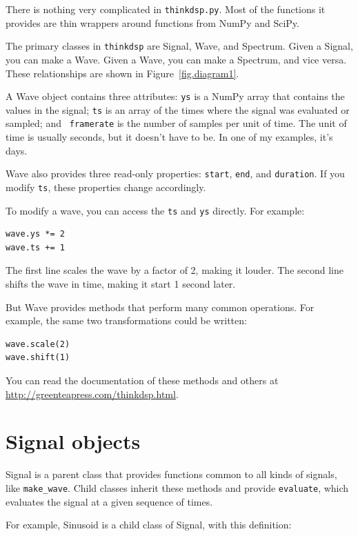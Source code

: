 \documentclass[12pt]{book}
\begin{document}
There is nothing very complicated in {\tt thinkdsp.py}.  Most
of the functions it provides are thin wrappers around functions
from NumPy and SciPy.

The primary classes in {\tt thinkdsp} are Signal, Wave, and Spectrum.
Given a Signal, you can make a Wave.  Given a Wave, you can
make a Spectrum, and vice versa.  These relationships are shown
in Figure~\ref{fig.diagram1}.

A Wave object contains three attributes: {\tt ys} is a NumPy array
that contains the values in the signal; {\tt ts} is an array of the
times where the signal was evaluated or sampled; and {\tt
  framerate} is the number of samples per unit of time.  The
unit of time is usually seconds, but it doesn't have to be.  In
one of my examples, it's days.

Wave also provides three read-only properties: {\tt start},
{\tt end}, and {\tt duration}.  If you modify {\tt ts}, these
properties change accordingly.

To modify a wave, you can access the {\tt ts} and {\tt ys} directly.
For example:

\begin{verbatim}
wave.ys *= 2
wave.ts += 1
\end{verbatim} 

The first line scales the wave by a factor of 2, making
it louder.  The second line shifts the wave in time, making it
start 1 second later.

But Wave provides methods that perform many common operations.
For example, the same two transformations could be written:

\begin{verbatim}
wave.scale(2)
wave.shift(1)
\end{verbatim} 

You can read the documentation of these methods and others at
\url{http://greenteapress.com/thinkdsp.html}.


\section{Signal objects}
\label{sigobs}

Signal is a parent class that provides functions common to all
kinds of signals, like \verb"make_wave".  Child classes inherit
these methods and provide {\tt evaluate}, which evaluates the
signal at a given sequence of times.

For example, Sinusoid is a child class of Signal, with this
definition:
\end{document}
